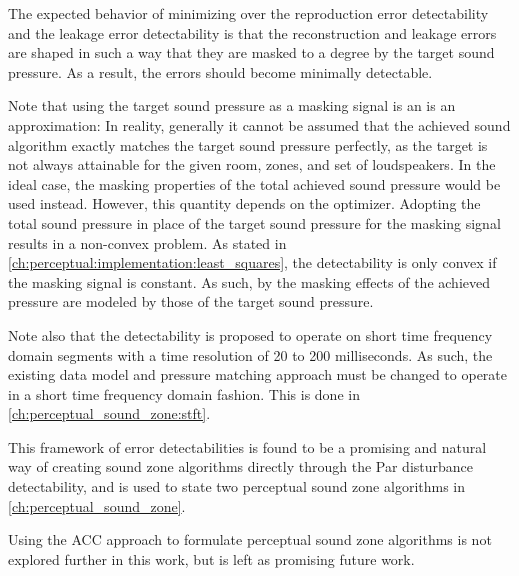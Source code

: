 The expected behavior of minimizing over the reproduction error detectability and the leakage error detectability 
is that the reconstruction and leakage errors are shaped in such a way that they are masked to a degree by the 
target sound pressure.
As a result, the errors should become minimally detectable.

Note that using the target sound pressure as a masking signal is an is an approximation: 
In reality, generally it cannot be assumed that the achieved sound algorithm exactly matches the target sound pressure 
perfectly, as the target is not always attainable for the given room, zones, and set of loudspeakers.
In the ideal case, the masking properties of the total achieved sound pressure would be used instead.
However, this quantity depends on the optimizer.
Adopting the total sound pressure in place of the target sound pressure for the masking signal results in a non-convex 
problem.
As stated in \autoref{ch:perceptual:implementation:least_squares}, the detectability is only convex if the masking signal 
is constant.
As such, by the masking effects of the achieved pressure are modeled by those of the target sound pressure.

Note also that the detectability is proposed to operate on short time frequency domain segments 
with a time resolution of 20 to 200 milliseconds. 
As such, the existing data model and pressure matching approach must be changed to operate in a short time frequency 
domain fashion.
This is done in \autoref{ch:perceptual_sound_zone:stft}.

This framework of error detectabilities is found to be a promising and natural 
way of creating sound zone algorithms directly through the Par disturbance detectability,
and is used to state two perceptual sound zone algorithms in \autoref{ch:perceptual_sound_zone}.

Using the ACC approach to formulate perceptual sound zone algorithms is not explored further in this work, 
but is left as promising future work.
